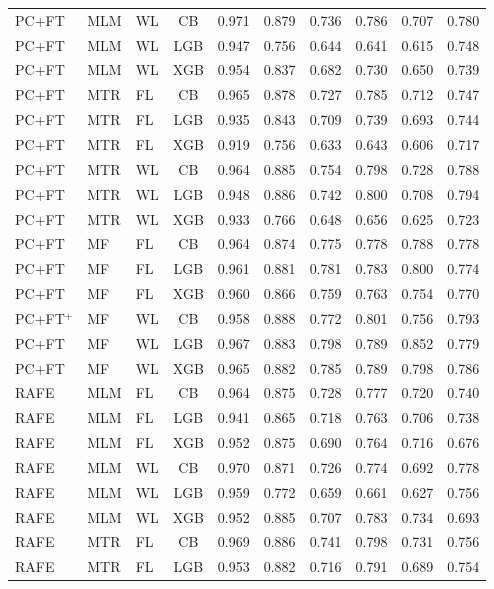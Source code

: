 \documentclass[9pt,a4paper]{article}
\begin{document}
\begin{scriptsize}
\begin{longtable}{lllcrrrrrr}
PC+FT & MLM & WL & CB  & 0.971 & 0.879 & 0.736 & 0.786 & 0.707 & 0.780 \\
PC+FT & MLM & WL & LGB & 0.947 & 0.756 & 0.644 & 0.641 & 0.615 & 0.748 \\
PC+FT & MLM & WL & XGB & 0.954 & 0.837 & 0.682 & 0.730 & 0.650 & 0.739 \\
PC+FT & MTR & FL & CB  & 0.965 & 0.878 & 0.727 & 0.785 & 0.712 & 0.747 \\
PC+FT & MTR & FL & LGB & 0.935 & 0.843 & 0.709 & 0.739 & 0.693 & 0.744 \\
PC+FT & MTR & FL & XGB & 0.919 & 0.756 & 0.633 & 0.643 & 0.606 & 0.717 \\
PC+FT & MTR & WL & CB  & 0.964 & 0.885 & 0.754 & 0.798 & 0.728 & 0.788 \\
PC+FT & MTR & WL & LGB & 0.948 & 0.886 & 0.742 & 0.800 & 0.708 & 0.794 \\
PC+FT & MTR & WL & XGB & 0.933 & 0.766 & 0.648 & 0.656 & 0.625 & 0.723 \\
PC+FT & MF  & FL & CB  & 0.964 & 0.874 & 0.775 & 0.778 & 0.788 & 0.778 \\
PC+FT & MF  & FL & LGB & 0.961 & 0.881 & 0.781 & 0.783 & 0.800 & 0.774 \\
PC+FT & MF  & FL & XGB & 0.960 & 0.866 & 0.759 & 0.763 & 0.754 & 0.770 \\
PC+FT$^+$ & MF  & WL & CB  & 0.958 & 0.888 & 0.772 & 0.801 & 0.756 & 0.793 \\
PC+FT & MF  & WL & LGB & 0.967 & 0.883 & 0.798 & 0.789 & 0.852 & 0.779 \\
PC+FT & MF  & WL & XGB & 0.965 & 0.882 & 0.785 & 0.789 & 0.798 & 0.786 \\
\midrule
RAFE & MLM & FL & CB  & 0.964 & 0.875 & 0.728 & 0.777 & 0.720 & 0.740 \\
RAFE & MLM & FL & LGB & 0.941 & 0.865 & 0.718 & 0.763 & 0.706 & 0.738 \\
RAFE & MLM & FL & XGB & 0.952 & 0.875 & 0.690 & 0.764 & 0.716 & 0.676 \\
RAFE & MLM & WL & CB  & 0.970 & 0.871 & 0.726 & 0.774 & 0.692 & 0.778 \\
RAFE & MLM & WL & LGB & 0.959 & 0.772 & 0.659 & 0.661 & 0.627 & 0.756 \\
RAFE & MLM & WL & XGB & 0.952 & 0.885 & 0.707 & 0.783 & 0.734 & 0.693 \\
RAFE & MTR & FL & CB  & 0.969 & 0.886 & 0.741 & 0.798 & 0.731 & 0.756 \\
RAFE & MTR & FL & LGB & 0.953 & 0.882 & 0.716 & 0.791 & 0.689 & 0.754 \\

\end{longtable}
\end{scriptsize}
\end{document}
